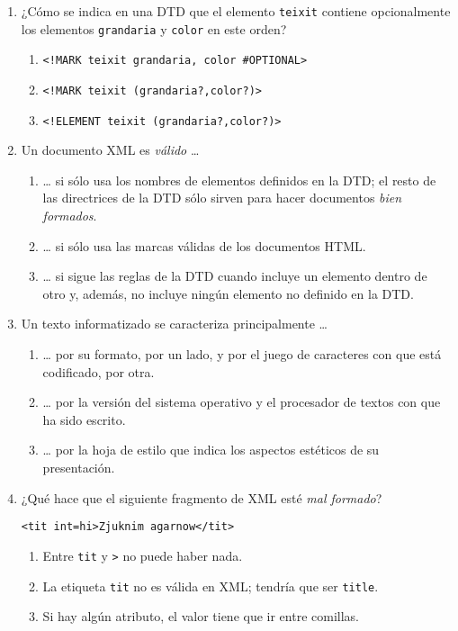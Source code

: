 {\begin{enumerate}
\item ¿Cómo se indica en una DTD que el elemento \texttt{teixit} contiene opcionalmente los elementos \texttt{grandaria} y  \texttt{color} en este orden? \begin{enumerate} \item \verb|<!MARK teixit grandaria, color #OPTIONAL>| \item \verb|<!MARK teixit (grandaria?,color?)>| \item \verb|<!ELEMENT teixit (grandaria?,color?)>| \end{enumerate} 

\item Un documento XML es \emph{válido} {\ldots} \begin{enumerate} \item {\ldots} si sólo usa los nombres de elementos definidos en la DTD; el resto de las directrices de la DTD sólo sirven para hacer documentos \emph{bien formados}. \item {\ldots} si sólo usa las marcas válidas de los documentos HTML. \item {\ldots} si sigue las reglas de la DTD cuando incluye un elemento dentro de otro y, además, no incluye ningún elemento no definido en la DTD. \end{enumerate} 

\item Un texto informatizado se caracteriza principalmente {\ldots} \begin{enumerate} \item {\ldots} por su formato, por un lado, y por el juego de caracteres con que está codificado, por otra. \item {\ldots} por la versión del sistema operativo y el procesador de textos con que ha sido escrito. \item {\ldots} por la hoja de estilo que indica los aspectos estéticos de su presentación. \end{enumerate} 

\item ¿Qué hace que el siguiente fragmento de XML esté \emph{mal formado}? \begin{center}\verb|<tit int=hi>Zjuknim agarnow</tit>|\end{center} \begin{enumerate} \item Entre \verb|tit| y \verb|>| no puede haber nada. \item La etiqueta \verb|tit| no es válida en XML; tendría que ser \verb|title|. \item Si hay algún atributo, el valor tiene que ir entre comillas. \end{enumerate} 


\end{enumerate}}
